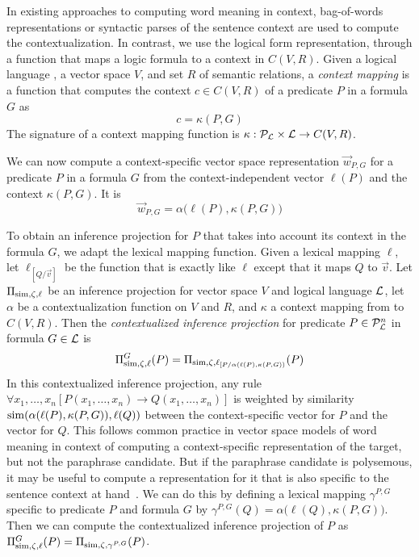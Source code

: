 In existing approaches to computing word meaning in context, bag-of-words
representations or syntactic parses of the sentence context are used to compute
the contextualization. In contrast, we use the logical form representation,
through a function that maps a logic formula to a context in $C(V, R)$.  Given a
logical language \loglang, a vector space $V$, and set $R$ of semantic
relations, a \textit{context mapping} is a function that computes the context $c
\in C(V, R)$ of a predicate $P$ in a formula $G$ as \[c = \kappa(P, G)\] The
signature of a context mapping function is $\kappa:
{\cal{P}}_{{\cal{L}}} \times {\cal{L}} \to C(V, R)$.

We can now compute a context-specific vector space representation $\vec{w}_{P,
G}$ for a predicate $P$ in a formula $G$ from the context-independent vector
$\ell(P)$ and the context $\kappa(P, G)$. It is \[\vec{w}_{P, G} =
\alpha\big(\ell(P), \kappa(P, G)\big)\]

To obtain an inference projection for $P$ that takes into account its context in
the formula $G$, we adapt the lexical mapping function. Given a lexical mapping
$\ell$, let $\ell_{[Q/\vec{v}]}$ be the function that is exactly like $\ell$
except that it maps $Q$ to $\vec v$. Let $\Pi_{\mathrm{sim}, \zeta, \ell}$ be an
inference projection for vector space $V$ and logical language ${\cal{L}}$, let
$\alpha$ be a contextualization function on $V$ and $R$, and $\kappa$ a context
mapping from \loglang to $C(V, R)$. Then the \textit{contextualized inference
projection} for predicate $P \in {\cal{P}}_{{\cal{L}}}^n$ in formula $G \in
{\cal{L}}$ is \[ \Pi^G_{\mathrm{sim}, \zeta, \ell}(P) = \Pi_{\mathrm{sim}, \zeta,
  \ell_{[P/\alpha(\ell(P), \kappa(P, G))}}(P)
\] In this contextualized inference projection, any rule $\forall x_1,\ldots,x_n [P(
x_1,\ldots,x_n) \to Q(x_1,\ldots,x_n)]$ is weighted by similarity $\mathrm{sim}(\alpha(\ell(P), \kappa(P,
G)), \ell(Q))$ between the context-specific vector for $P$ and the vector for
$Q$. This follows common practice in vector space models of word meaning in
context of computing a context-specific representation of the target, but not
the paraphrase candidate. But if the paraphrase candidate is polysemous, it may
be useful to compute a representation for it that is also specific to the
sentence context at hand~\citep{erk:acl2010}.  We can do this by defining a
lexical mapping $\gamma^{P, G}$ specific to predicate $P$ and formula $G$ by
$\gamma^{P, G}(Q) = \alpha\big(\ell(Q), \kappa(P, G)\big)$. Then we can compute
the contextualized inference projection of $P$ as $\Pi^G_{\mathrm{sim}, \zeta,
\ell}(P) = \Pi_{\mathrm{sim}, \zeta, \gamma^{P, G}}(P)$.

